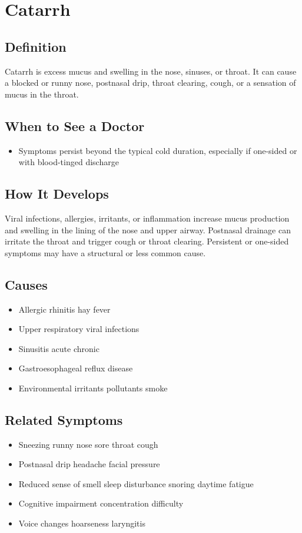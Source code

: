 \chapter{Catarrh}

\section*{Definition}
Catarrh is excess mucus and swelling in the nose, sinuses, or throat. It can cause a blocked or runny nose, postnasal drip, throat clearing, cough, or a sensation of mucus in the throat.

\section*{When to See a Doctor}

\begin{itemize}
  \item Symptoms persist beyond the typical cold duration, especially if one-sided or with blood-tinged discharge
\end{itemize}

\section*{How It Develops}
Viral infections, allergies, irritants, or inflammation increase mucus production and swelling in the lining of the nose and upper airway. Postnasal drainage can irritate the throat and trigger cough or throat clearing. Persistent or one-sided symptoms may have a structural or less common cause.

\section*{Causes}
\begin{itemize}
 \item Allergic rhinitis hay fever
 \item Upper respiratory viral infections
 \item Sinusitis acute chronic
 \item Gastroesophageal reflux disease
 \item Environmental irritants pollutants smoke
\end{itemize}

\section*{Related Symptoms}
\begin{itemize}
 \item Sneezing runny nose sore throat cough
 \item Postnasal drip headache facial pressure
 \item Reduced sense of smell sleep disturbance snoring daytime fatigue
 \item Cognitive impairment concentration difficulty
 \item Voice changes hoarseness laryngitis
\end{itemize}

